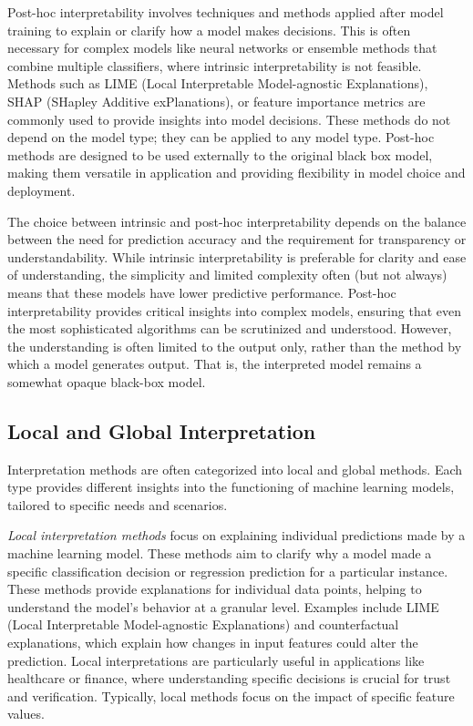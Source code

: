 Post-hoc interpretability involves techniques and methods applied after model training to explain or clarify how a model makes decisions. This is often necessary for complex models like neural networks or ensemble methods that combine multiple classifiers, where intrinsic interpretability is not feasible. Methods such as LIME (Local Interpretable Model-agnostic Explanations), SHAP (SHapley Additive exPlanations), or feature importance metrics are commonly used to provide insights into model decisions. These methods do not depend on the model type; they can be applied to any model type. Post-hoc methods are designed to be used externally to the original black box model, making them versatile in application and providing flexibility in model choice and deployment.

The choice between intrinsic and post-hoc interpretability depends on the balance between the need for prediction accuracy and the requirement for transparency or understandability. While intrinsic interpretability is preferable for clarity and ease of understanding, the simplicity and limited complexity often (but not always) means that these models have lower predictive performance. Post-hoc interpretability provides critical insights into complex models, ensuring that even the most sophisticated algorithms can be scrutinized and understood. However, the understanding is often limited to the output only, rather than the method by which a model generates output. That is, the interpreted model remains a somewhat opaque black-box model.

\subsection*{Local and Global Interpretation}

Interpretation methods are often categorized into local and global methods. Each type provides different insights into the functioning of machine learning models, tailored to specific needs and scenarios.

\emph{Local interpretation methods} focus on explaining individual predictions made by a machine learning model. These methods aim to clarify why a model made a specific classification decision or regression prediction for a particular instance. These methods provide explanations for individual data points, helping to understand the model's behavior at a granular level. Examples include LIME (Local Interpretable Model-agnostic Explanations) and counterfactual explanations, which explain how changes in input features could alter the prediction. Local interpretations are particularly useful in applications like healthcare or finance, where understanding specific decisions is crucial for trust and verification. Typically, local methods focus on the impact of specific feature values.

